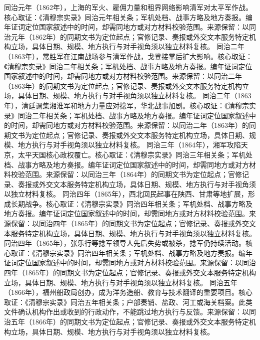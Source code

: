 同治元年（1862年），上海的军火、雇佣力量和租界网络影响清军对太平军作战。核心取证：《清穆宗实录》同治元年相关条；军机处档、战事方略及地方奏报。编年证词定位国家叙述中的时间，却需同地方或对方材料校验范围。来源保留：以同治元年（1862年）的同期文书为定位起点；官修记录、奏报或外交文本服务特定机构立场，具体日期、规模、地方执行与对手视角须以独立材料复核。
同治二年（1863年），常胜军在江南战场参与清军作战，戈登接掌后扩大影响。核心取证：《清穆宗实录》同治二年相关条；军机处档、战事方略及地方奏报。编年证词定位国家叙述中的时间，却需同地方或对方材料校验范围。来源保留：以同治二年（1863年）的同期文书为定位起点；官修记录、奏报或外交文本服务特定机构立场，具体日期、规模、地方执行与对手视角须以独立材料复核。
同治二年（1863年），清廷调集湘淮军和地方力量应对捻军，华北战事加剧。核心取证：《清穆宗实录》同治二年相关条；军机处档、战事方略及地方奏报。编年证词定位国家叙述中的时间，却需同地方或对方材料校验范围。来源保留：以同治二年（1863年）的同期文书为定位起点；官修记录、奏报或外交文本服务特定机构立场，具体日期、规模、地方执行与对手视角须以独立材料复核。
同治三年（1864年），湘军攻陷天京，太平天国核心政权覆亡。核心取证：《清穆宗实录》同治三年相关条；军机处档、战事方略及地方奏报。编年证词定位国家叙述中的时间，却需同地方或对方材料校验范围。来源保留：以同治三年（1864年）的同期文书为定位起点；官修记录、奏报或外交文本服务特定机构立场，具体日期、规模、地方执行与对手视角须以独立材料复核。
同治四年（1865年），西北回民起事在陕西、甘肃等地扩展，形成长期战争。核心取证：《清穆宗实录》同治四年相关条；军机处档、战事方略及地方奏报。编年证词定位国家叙述中的时间，却需同地方或对方材料校验范围。来源保留：以同治四年（1865年）的同期文书为定位起点；官修记录、奏报或外交文本服务特定机构立场，具体日期、规模、地方执行与对手视角须以独立材料复核。
同治四年（1865年），张乐行等捻军领导人先后失势或被杀，捻军仍持续活动。核心取证：《清穆宗实录》同治四年相关条；军机处档、战事方略及地方奏报。编年证词定位国家叙述中的时间，却需同地方或对方材料校验范围。来源保留：以同治四年（1865年）的同期文书为定位起点；官修记录、奏报或外交文本服务特定机构立场，具体日期、规模、地方执行与对手视角须以独立材料复核。
同治五年（1866年），福州船政局创办，成为洋务造船、教育与技术翻译的重要项目。核心取证：《清穆宗实录》同治五年相关条；户部奏销、盐政、河工或海关档案。此类文件确认机构作出或收到的行政动作，不能跳过地方执行与反馈。来源保留：以同治五年（1866年）的同期文书为定位起点；官修记录、奏报或外交文本服务特定机构立场，具体日期、规模、地方执行与对手视角须以独立材料复核。
